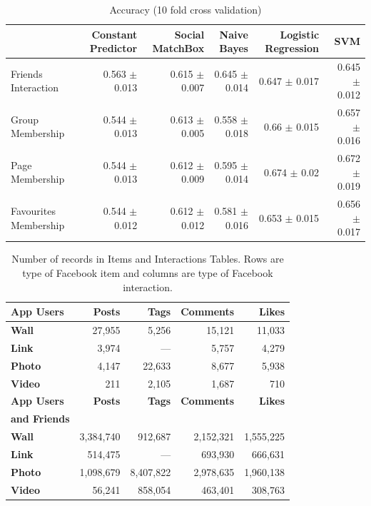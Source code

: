 \documentclass[letterpaper]{article}
\begin{document}
\begin{table}
	\centering
	\footnotesize
  	 \begin{tabular}{| >{\small}l| >{\small}r |>{\small}r | >{\small}r |>{\small}r | >{\small}r  | } 
	\hline
	&Constant Predictor & Social MatchBox & Naive Bayes & Logistic Regression & SVM \\
	\hline
	Friends Interaction & 0.563 $\pm$ 0.013 & 0.615 $\pm$ 0.007 & 0.645 $\pm$ 0.014 & 0.647 $\pm$ 0.017 & 0.645 $\pm$ 0.012\\
	\hline
	Group Membership & 0.544 $\pm$ 0.013 & 0.613 $\pm$ 0.005 & 0.558 $\pm$ 0.018 & 0.66 $\pm$ 0.015 & 0.657 $\pm$ 0.016\\
	\hline
	Page Membership & 0.544 $\pm$ 0.013 & 0.612 $\pm$ 0.009 & 0.595 $\pm$ 0.014 & 0.674 $\pm$ 0.02 & 0.672 $\pm$ 0.019\\
	\hline
	Favourites Membership & 0.544 $\pm$ 0.012 & 0.612 $\pm$ 0.012 & 0.581 $\pm$ 0.016& 0.653 $\pm$ 0.015& 0.656 $\pm$ 0.017\\
	\hline
    \end{tabular}
   \caption{Accuracy (10 fold cross validation) }
\end{table}

\begin{table}
	\centering
		\begin{tabular}{|>{\small}l|>{\small}r|>{\small}r|>{\small}r|>{\small}r|}
			\hline

			\textbf{App Users} & \textbf{Posts} & \textbf{Tags} & \textbf{Comments} & \textbf{Likes} \\
			\hline
			\textbf{Wall} & 27,955 & 5,256 & 15,121 & 11,033 \\
			\hline
			\textbf{Link} & 3,974 & --- & 5,757 & 4,279 \\
			\hline
			\textbf{Photo} & 4,147 & 22,633 & 8,677 & 5,938 \\
			\hline
			\textbf{Video} & 211 & 2,105 & 1,687 & 710 \\
			\hline
			\hline
			\textbf{App Users} & \textbf{Posts} & \textbf{Tags} & \textbf{Comments} & \textbf{Likes} \\
			\textbf{and Friends} & & & & \\
			\hline
			\textbf{Wall} & 3,384,740 & 912,687 & 2,152,321 & 1,555,225 \\
			\hline
			\textbf{Link} & 514,475 & --- & 693,930 & 666,631 \\
			\hline
			\textbf{Photo} & 1,098,679 & 8,407,822 & 2,978,635 & 1,960,138 \\
			\hline
			\textbf{Video} & 56,241 & 858,054 & 463,401 & 308,763 \\
			\hline
		\end{tabular}
	\caption{Number of records in Items and Interactions Tables. Rows are type of Facebook item and columns are type of Facebook interaction.}
	\label{tab:interactions}
\end{table}
\end{document}
